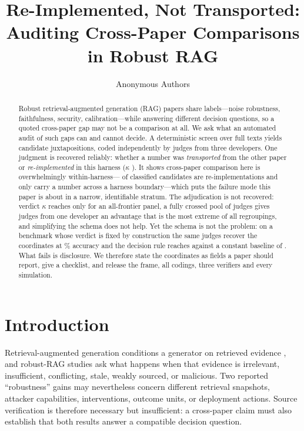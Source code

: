 \documentclass[11pt]{article}
\title{Re-Implemented, Not Transported:\\
Auditing Cross-Paper Comparisons in Robust RAG}
\author{Anonymous Authors}
\date{}
\begin{document}
\maketitle

\begin{abstract}
Robust retrieval-augmented generation (RAG) papers share labels---noise
robustness, faithfulness, security, calibration---while answering different
decision questions, so a quoted cross-paper gap may not be a comparison at all.
We ask what an automated audit of such gaps can and cannot decide. A
deterministic screen over \FrameScreened{} full texts yields \FrameCandidates{}
candidate juxtapositions, coded independently by judges from three developers.
One judgment is recovered reliably: whether a number was \emph{transported} from
the other paper or \emph{re-implemented} in this harness ($\kappa$ \DecProvK{}).
It shows cross-paper comparison here is overwhelmingly within-harness---
\ProvReimplemented{} of \ProvClassified{} classified candidates are
re-implementations and only \ProvTransported{} carry a number across a harness
boundary---which puts the failure mode this paper is about in a narrow,
identifiable stratum. The adjudication is not recovered: verdict $\kappa$
reaches only \TierFrontierVerdictK{} for an all-frontier panel, a fully crossed
pool of \TierPanelN{} judges gives judges from one developer an advantage that
is the most extreme of all \TierDevRand{} regroupings, and simplifying the
schema does not help. Yet the schema is not the problem: on a benchmark whose
verdict is fixed by construction the same judges recover the coordinates at
\InsCoordFullPct\% accuracy and the decision rule reaches \InsRule{} against a
constant baseline of \InsBaseline{}. What fails is disclosure. We therefore
state the coordinates as fields a paper should report, give a checklist, and
release the frame, all codings, three verifiers and every simulation.
\end{abstract}

\section{Introduction}
\label{sec:introduction}

Retrieval-augmented generation conditions a generator on retrieved evidence
\citep{lewis2020rag,dpr2020,realm2020}, and robust-RAG studies ask what happens
when that evidence is irrelevant, insufficient, conflicting, stale, weakly
sourced, or malicious. Two reported ``robustness'' gains may nevertheless
concern different retrieval snapshots, attacker capabilities, interventions,
outcome units, or deployment actions. Source verification is therefore
necessary but insufficient: a cross-paper claim must also establish that both
results answer a compatible decision question.
\end{document}
